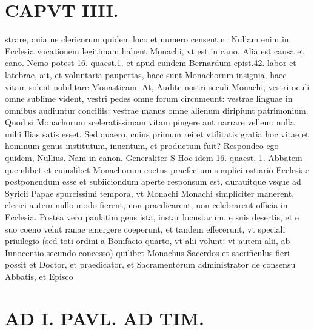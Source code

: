 \documentclass{article}
\begin{document}
\begin{pages}
\section*{CAPVT  IIII. }
\marginpar{[ p.223 ]}\pstart strare, quia ne clericorum quidem loco et numero censentur. Nullam enim in Ecclesia vocationem legitimam habent Monachi, vt est in cano. Alia est causa et cano. Nemo potest 16. quaest.1. et apud eundem Bernardum epist.42. labor et latebrae, ait, et voluntaria paupertas, haec sunt Monachorum insignia, haec vitam solent nobilitare Monasticam. At, Audite nostri seculi Monachi, vestri oculi omne sublime vident, vestri pedes omne forum circumeunt: vestrae linguae in omnibus audiuntur conciliis: vestrae manus omne alienum diripiunt patrimonium. Quod si Monachorum sceleratissimam vitam pingere aut narrare vellem: nulla mihi Ilias satis esset. Sed quaero, cuius primum rei et vtilitatis gratia hoc vitae et hominum genus institutum, inuentum, et productum fuit? Respondeo ego quidem, Nullius. Nam in canon. Generaliter S Hoc idem 16. quaest. 1. Abbatem quemlibet et cuiuslibet Monachorum coetus praefectum simplici ostiario Ecclesiae postponendum esse et subiiciondum aperte responsum est, durauitque vsque ad Syricii Papae spurcissimi tempora, vt Monachi Monachi simpliciter manerent, clerici autem nullo modo fierent, non praedicarent, non celebrarent officia in Ecclesia. Postea vero paulatim gens ista, instar locustarum, e suis desertis, et e suo coeno velut ranae emergere coeperunt, et tandem effecerunt, vt speciali priuilegio (sed toti ordini a Bonifacio quarto, vt alii volunt: vt autem alii, ab Innocentio secundo concesso) quilibet Monachus Sacerdos et sacrificulus fieri possit et Doctor, et praedicator, et Sacramentorum administrator de consensu Abbatis, et Episco\pend
\section*{AD I. PAVL. AD TIM. }
\marginpar{[ p.224 ]}\pstart {}
{}

\end{pages}
\end{document}
